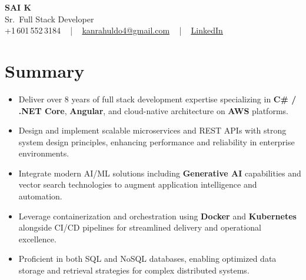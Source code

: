 \documentclass[letterpaper,11pt]{article}
\newcommand{\resumeItem}[1]{
  \item\footnotesize{
    {#1 \vspace{-2pt}}
  }
}
\newcommand{\resumeItemListStart}{\begin{itemize}[leftmargin=*]}
\newcommand{\resumeItemListEnd}{\end{itemize}\vspace{-5pt}}
\begin{document}
\begin{center}
    {\fontsize{14pt}{12pt}\selectfont \textbf{\MakeUppercase{Sai K}}}\\ \vspace{2pt}
    \fontsize{10pt}{12pt}\selectfont Sr.\ Full Stack Developer\\ \vspace{2pt}
    \fontsize{10pt}{12pt}\selectfont +1\,601\,552\,3184 ~ | ~
    \href{mailto:kanrahuldo4@gmail.com}{kanrahuldo4@gmail.com} ~ | ~
    \href{https://www.linkedin.com/in/srrrk/}{\color{blue}\underline{LinkedIn}}
    \vspace{-10pt}
\end{center}

\section{Summary}
\fontsize{9pt}{10pt}\selectfont
\resumeItemListStart
  \resumeItem{Deliver over 8 years of full stack development expertise specializing in \textbf{C\# / .NET Core}, \textbf{Angular}, and cloud-native architecture on \textbf{AWS} platforms.}
  \resumeItem{Design and implement scalable microservices and REST APIs with strong system design principles, enhancing performance and reliability in enterprise environments.}
  \resumeItem{Integrate modern AI/ML solutions including \textbf{Generative AI} capabilities and vector search technologies to augment application intelligence and automation.}
  \resumeItem{Leverage containerization and orchestration using \textbf{Docker} and \textbf{Kubernetes} alongside CI/CD pipelines for streamlined delivery and operational excellence.}
  \resumeItem{Proficient in both SQL and NoSQL databases, enabling optimized data storage and retrieval strategies for complex distributed systems.}
\resumeItemListEnd
\vspace{-6pt}

\end{document}

